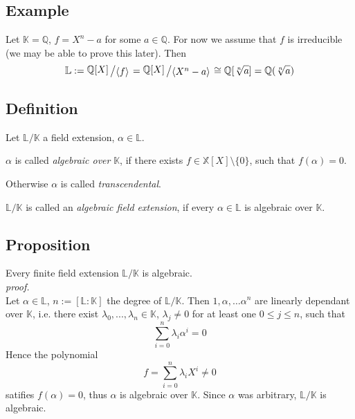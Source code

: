 \documentclass[12pt]{book}
\newcommand{\slant}[2]{{\raisebox{.1em}{$#1$}\left/\raisebox{-.1em}{$#2$}\right.}}
\begin{document}
\begin{spacing}{1.3}
\subsection*{Example} %
\titleformat{\subsection}{\normalfont\normalsize\bfseries}{}{0em}{#1 \thesubsection}
Let $\mathbb{K}=\mathbb{Q}$, $f=X^n-a$ for some $a \in \mathbb{Q}$. For now we assume that $f$ is irreducible (we may be able to prove this later). Then
$$\mathbb{L}:=\slant{\mathbb{Q}[X]}{\langle f \rangle}=\slant{\mathbb{Q}[X]}{\langle X^n-a\rangle} \cong \mathbb{Q}[\sqrt[n]{a}]=\mathbb{Q}(\sqrt[n]{a})$$

\subsection{Definition} %
Let $\mathbb{L}/\mathbb{K}$ a field extension, $\alpha \in \mathbb{L}$.
\begin{compactenum}
\item $\alpha$ is called \textit{algebraic over} $\mathbb{K}$, if there exists $f \in \mathbb{X}[X] \setminus \{0\}$, such that $f(\alpha)=0$.
\item Otherwise $\alpha$ is called \textit{transcendental}.
\item $\mathbb{L}/\mathbb{K}$ is called an \textit{algebraic field extension}, if every $\alpha \in \mathbb{L}$ is algebraic over $\mathbb{K}$.
\end{compactenum}

\subsection{Proposition} %
Every finite field extension $\mathbb{L}/\mathbb{K}$ is algebraic.\\
\textit{proof.}\\
Let $\alpha \in \mathbb{L}$, $n:=[\mathbb{L}:\mathbb{K}]$ the degree of $\mathbb{L}/\mathbb{K}$. Then $1,\alpha, \dots \alpha^{n}$ are linearly dependant over $\mathbb{K}$, i.e. there exist $\lambda_0,...,\lambda_n \in \mathbb{K}$, $\lambda_j \neq 0$ for at least one $0 \leqslant j \leqslant n$, such that $$\sum_{i=0}^{n} \lambda_i \alpha^{i}=0$$
Hence the polynomial $$f=\sum_{i=0}^n \lambda_i X^{i} \neq 0$$ satifies $f(\alpha)=0$, thus $\alpha$ is algebraic over $\mathbb{K}$. Since $\alpha$ was arbitrary, $\mathbb{L}/\mathbb{K}$ is algebraic.


\end{spacing}
\end{document}
